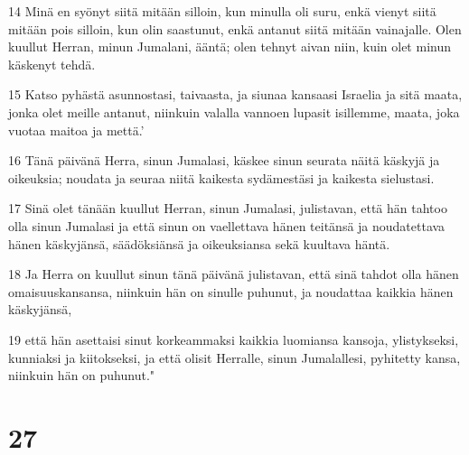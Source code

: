 \par 14 Minä en syönyt siitä mitään silloin, kun minulla oli suru, enkä vienyt siitä mitään pois silloin, kun olin saastunut, enkä antanut siitä mitään vainajalle. Olen kuullut Herran, minun Jumalani, ääntä; olen tehnyt aivan niin, kuin olet minun käskenyt tehdä.
\par 15 Katso pyhästä asunnostasi, taivaasta, ja siunaa kansaasi Israelia ja sitä maata, jonka olet meille antanut, niinkuin valalla vannoen lupasit isillemme, maata, joka vuotaa maitoa ja mettä.'
\par 16 Tänä päivänä Herra, sinun Jumalasi, käskee sinun seurata näitä käskyjä ja oikeuksia; noudata ja seuraa niitä kaikesta sydämestäsi ja kaikesta sielustasi.
\par 17 Sinä olet tänään kuullut Herran, sinun Jumalasi, julistavan, että hän tahtoo olla sinun Jumalasi ja että sinun on vaellettava hänen teitänsä ja noudatettava hänen käskyjänsä, säädöksiänsä ja oikeuksiansa sekä kuultava häntä.
\par 18 Ja Herra on kuullut sinun tänä päivänä julistavan, että sinä tahdot olla hänen omaisuuskansansa, niinkuin hän on sinulle puhunut, ja noudattaa kaikkia hänen käskyjänsä,
\par 19 että hän asettaisi sinut korkeammaksi kaikkia luomiansa kansoja, ylistykseksi, kunniaksi ja kiitokseksi, ja että olisit Herralle, sinun Jumalallesi, pyhitetty kansa, niinkuin hän on puhunut."

\chapter{27}

